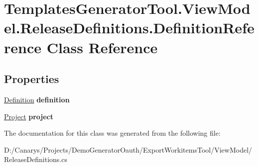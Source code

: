 \hypertarget{class_templates_generator_tool_1_1_view_model_1_1_release_definitions_1_1_definition_reference}{}\section{Templates\+Generator\+Tool.\+View\+Model.\+Release\+Definitions.\+Definition\+Reference Class Reference}
\label{class_templates_generator_tool_1_1_view_model_1_1_release_definitions_1_1_definition_reference}
\subsection*{Properties}
\begin{DoxyCompactItemize}
\item 
\mbox{\label{class_templates_generator_tool_1_1_view_model_1_1_release_definitions_1_1_definition_reference_ac3812075c26ca8bd4f4aa9b848a78ee3}} 
\mbox{\hyperlink{class_templates_generator_tool_1_1_view_model_1_1_release_definitions_1_1_definition}{Definition}} {\bfseries definition}
\item 
\mbox{\label{class_templates_generator_tool_1_1_view_model_1_1_release_definitions_1_1_definition_reference_a8743850f594add28dd2433bd95100d6e}} 
\mbox{\hyperlink{class_templates_generator_tool_1_1_view_model_1_1_release_definitions_1_1_project}{Project}} {\bfseries project}
\end{DoxyCompactItemize}


The documentation for this class was generated from the following file\+:\begin{DoxyCompactItemize}
\item 
D\+:/\+Canarys/\+Projects/\+Demo\+Generator\+Oauth/\+Export\+Workitems\+Tool/\+View\+Model/Release\+Definitions.\+cs\end{DoxyCompactItemize}

